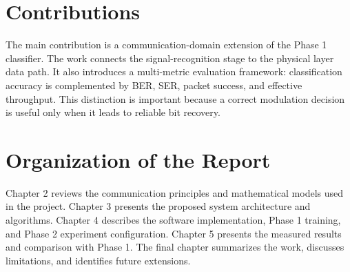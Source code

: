 \section{Contributions}
The main contribution is a communication-domain extension of the Phase 1
classifier. The work connects the signal-recognition stage to the physical
layer data path. It also introduces a multi-metric evaluation framework:
classification accuracy is complemented by BER, SER, packet success, and
effective throughput. This distinction is important because a correct
modulation decision is useful only when it leads to reliable bit recovery.

\section{Organization of the Report}
Chapter 2 reviews the communication principles and mathematical models used
in the project. Chapter 3 presents the proposed system architecture and
algorithms. Chapter 4 describes the software implementation, Phase 1
training, and Phase 2 experiment configuration. Chapter 5 presents the
measured results and comparison with Phase 1. The final chapter summarizes
the work, discusses limitations, and identifies future extensions.
